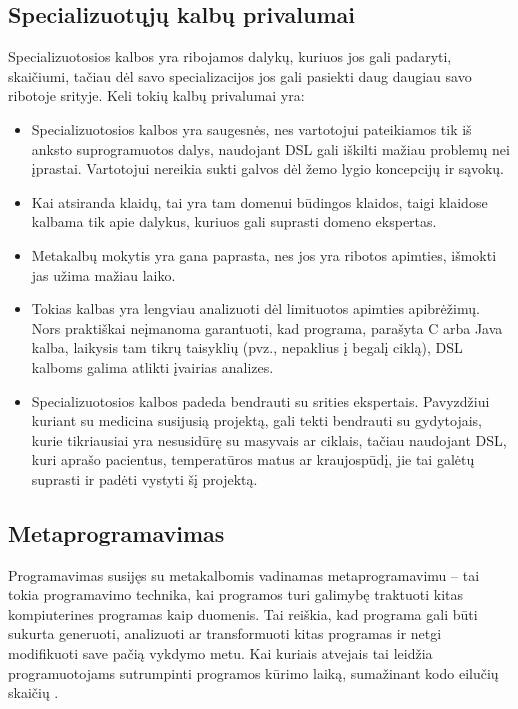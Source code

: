 \documentclass{VUMIFPSkursinis}
\begin{document}
\subsection{Specializuotųjų kalbų privalumai}

Specializuotosios kalbos yra ribojamos dalykų, kuriuos jos gali padaryti, skaičiumi, tačiau dėl savo specializacijos jos gali pasiekti daug daugiau savo ribotoje srityje. Keli tokių kalbų privalumai yra:
\begin{itemize}
    \item Specializuotosios kalbos yra saugesnės, nes vartotojui pateikiamos tik iš anksto suprogramuotos dalys, naudojant DSL gali iškilti mažiau problemų nei įprastai. Vartotojui nereikia sukti galvos dėl žemo lygio koncepcijų ir sąvokų.
    \item Kai atsiranda klaidų, tai yra tam domenui būdingos klaidos, taigi klaidose kalbama tik apie dalykus, kuriuos gali suprasti domeno ekspertas.
    \item Metakalbų mokytis yra gana paprasta, nes jos yra ribotos apimties, išmokti jas užima mažiau laiko.
    \item Tokias kalbas yra lengviau analizuoti dėl limituotos apimties apibrėžimų. Nors praktiškai neįmanoma garantuoti, kad programa, parašyta C arba Java kalba, laikysis tam tikrų taisyklių (pvz., nepaklius į begalį ciklą), DSL kalboms galima atlikti įvairias analizes.
    \item Specializuotosios kalbos padeda bendrauti su srities ekspertais. Pavyzdžiui kuriant su medicina susijusią projektą, gali tekti bendrauti su gydytojais, kurie tikriausiai yra nesusidūrę su masyvais ar ciklais, tačiau naudojant DSL, kuri aprašo pacientus, temperatūros matus ar kraujospūdį, jie tai galėtų suprasti ir padėti vystyti šį projektą. \cite{tomassetti2017complete}
\end{itemize}


\subsection{Metaprogramavimas}

Programavimas susijęs su metakalbomis vadinamas metaprogramavimu -- tai tokia programavimo technika, kai programos turi galimybę traktuoti kitas kompiuterines programas kaip duomenis. Tai reiškia, kad programa gali būti sukurta generuoti, analizuoti ar transformuoti kitas programas ir netgi modifikuoti save pačią vykdymo metu. Kai kuriais atvejais tai leidžia programuotojams sutrumpinti programos kūrimo laiką, sumažinant kodo eilučių skaičių \cite{czarnecki2000generative}.
\end{document}

